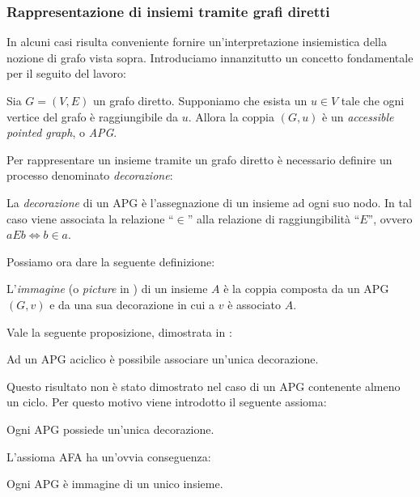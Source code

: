 
\subsubsection{Rappresentazione di insiemi tramite grafi diretti}
\label{sec:graphs_sets}
In alcuni casi risulta conveniente fornire un'in\-ter\-pre\-ta\-zio\-ne insiemistica della nozione di grafo vista sopra. Introduciamo innanzitutto un concetto fondamentale per il seguito del lavoro:
\begin{definition}
    Sia $G = (V, E)$ un grafo diretto. Supponiamo che esista un $u \in V$ tale che ogni vertice del grafo è raggiungibile da $u$. Allora la coppia $(G, u)$ è un \emph{accessible pointed graph}, o \emph{APG}.
\end{definition}
Per rappresentare un insieme tramite un grafo diretto è necessario definire un processo denominato \emph{decorazione}:
\begin{definition}
    La \emph{decorazione} di un APG è l'assegnazione di un insieme ad ogni suo nodo. In tal caso viene associata la relazione ``$\in$'' alla relazione di raggiungibilità ``$E$'', ovvero $aEb \iff b \in a$.
\end{definition}
Possiamo ora dare la seguente definizione:
\begin{definition}
    L'\emph{immagine} (o \emph{picture} in \cite{aczel}) di un insieme $A$ è la coppia composta da un APG $(G,v)$ e da una sua decorazione in cui a $v$ è associato $A$.
\end{definition}
Vale la seguente proposizione, dimostrata in \cite{aczel}:
\begin{proposition}
    Ad un APG aciclico è possibile associare un'unica decorazione.
\end{proposition}
Questo risultato non è stato dimostrato nel caso di un APG contenente almeno un ciclo. Per questo motivo viene introdotto il seguente assioma:
\begin{axiom}
    Ogni APG possiede un'unica decorazione.
\end{axiom}
L'assioma AFA ha un'ovvia conseguenza:
\begin{corollary}
    Ogni APG è immagine di un unico insieme.
\end{corollary}
